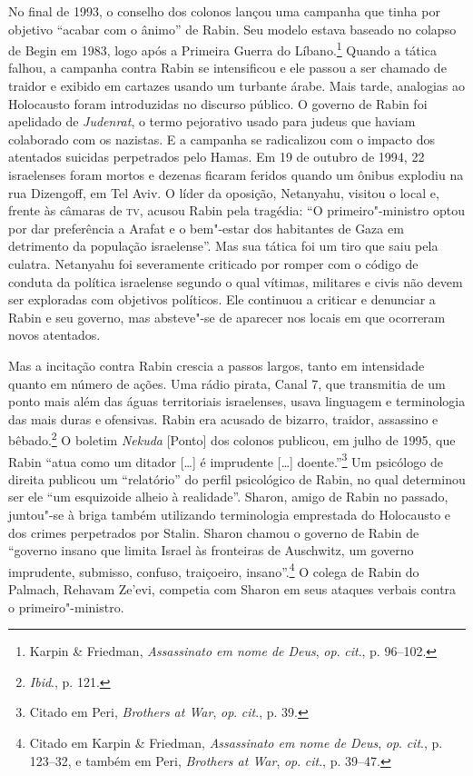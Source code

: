 No final de 1993, o conselho dos colonos lançou uma campanha que tinha por objetivo
``acabar com o ânimo'' de Rabin. Seu modelo estava baseado no colapso de
Begin em 1983, logo após a Primeira Guerra do Líbano.\footnote{Karpin \& Friedman, \textit{Assassinato em nome de Deus},
\textit{op}. \textit{cit}., p. 96--102.} Quando
a tática falhou, a campanha contra Rabin se intensificou e ele passou a
ser chamado de traidor e exibido em cartazes usando um turbante árabe.
Mais tarde, analogias ao Holocausto foram introduzidas no discurso
público. O governo de Rabin foi apelidado de \textit{Judenrat}, o termo
pejorativo usado para judeus que haviam colaborado com os nazistas. E a
campanha se radicalizou com o impacto dos atentados suicidas perpetrados
pelo Hamas. Em 19 de outubro de 1994, 22 israelenses foram
mortos e dezenas ficaram feridos quando um ônibus explodiu na rua Dizengoff, em
Tel Aviv. O líder da oposição, Netanyahu, visitou o local e, frente às
câmaras de \textsc{tv}, acusou Rabin pela tragédia: ``O primeiro"-ministro optou
por dar preferência a Arafat e o bem"-estar dos habitantes de Gaza em
detrimento da população israelense''. Mas sua tática foi um tiro que
saiu pela culatra. Netanyahu foi severamente criticado por romper com o
código de conduta da política israelense segundo o qual vítimas,
militares e civis não devem ser exploradas com objetivos políticos. Ele
continuou a criticar e denunciar a Rabin e seu governo, mas absteve"-se
de aparecer nos locais em que ocorreram novos atentados.

Mas a incitação contra Rabin crescia a passos largos, tanto em
intensidade quanto em número de ações. Uma rádio pirata, Canal 7, que
transmitia de um ponto mais além das águas territoriais israelenses,
usava linguagem e terminologia das mais duras e ofensivas. Rabin era
acusado de bizarro, traidor, assassino e bêbado.\footnote{\textit{Ibid}., p. 121.} O
boletim \textit{Nekuda} {[}Ponto{]} dos colonos publicou, em julho de 1995, que Rabin
``atua como um ditador {[}\ldots{}{]} é imprudente {[}\ldots{}{]} doente.''\footnote{Citado em Peri, \textit{Brothers at War}, \textit{op}. \textit{cit}., p. 39.} Um
psicólogo de direita publicou um ``relatório'' do perfil psicológico de
Rabin, no qual determinou ser ele ``um esquizoide alheio à realidade''.
Sharon, amigo de Rabin no passado, juntou"-se à briga também utilizando
terminologia emprestada do Holocausto e dos crimes perpetrados por
Stalin. Sharon chamou o governo de Rabin de ``governo insano que limita
Israel às fronteiras de Auschwitz, um governo imprudente, submisso,
confuso, traiçoeiro, insano''.\footnote{Citado em Karpin \& Friedman, \textit{Assassinato em nome de Deus}, \textit{op}. \textit{cit}., p. 123--32, e também em Peri, 
\textit{Brothers at War}, \textit{op}. \textit{cit}., p. 39--47.} O colega de Rabin do Palmach, Rehavam Ze'evi, competia com Sharon em seus ataques verbais contra o
primeiro"-ministro.

